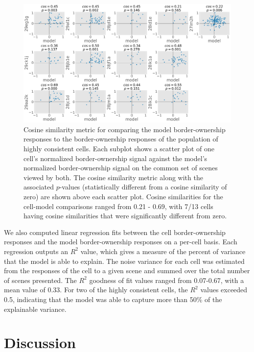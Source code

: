 \begin{figure}[t!]
\centering
\includegraphics[width=\textwidth]{NaturalImage/figs/cell_model_cos_p}
\makeatletter
\let\@currsize\normalsize
\caption[Cosine similarity between model and cell responses]{Cosine similarity metric for comparing the model border-ownership responses to the border-ownership responses of the population of highly consistent cells. Each subplot shows a scatter plot of one cell's normalized border-ownership signal against the model's normalized border-ownership signal on the common set of scenes viewed by both. The cosine similarity metric along with the associated $p$-values (statistically different from a cosine similarity of zero) are shown above each scatter plot. Cosine similarities for the cell-model comparisons ranged from 0.21 - 0.69, with 7/13 cells having cosine similarities that were significantly different from zero.}
\label{Fig:cell_model_cos}
\end{figure}

We also computed linear regression fits between the cell border-ownership responses and the model border-ownership responses on a per-cell basis. Each regression outputs an $R^2$ value, which gives a measure of the percent of variance that the model is able to explain. The noise variance for each cell was estimated from the responses of the cell to a given scene and summed over the total number of scenes presented. The $R^2$ goodness of fit values ranged from 0.07-0.67, with a mean value of 0.33. For two of the highly consistent cells, the $R^2$ values exceeded 0.5, indicating that the model was able to capture more than 50\% of the explainable variance.

\section{Discussion}
\label{sec:discussion}

